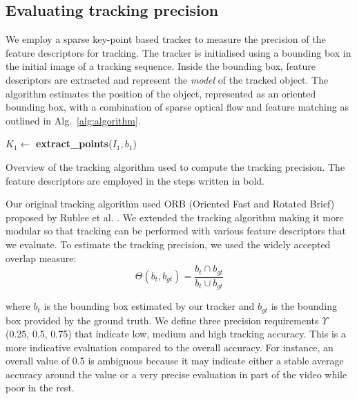 \subsection{Evaluating tracking precision}
\label{sec:accuracy}

We employ a sparse key-point based tracker to measure the precision of the feature descriptors for tracking. The tracker is initialised using a bounding box in the initial image of a tracking sequence. Inside the bounding box, feature descriptors are extracted and represent the \textit{model} of the tracked object. The algorithm estimates the position of the object, represented as an oriented bounding box, with a combination of sparse optical flow and feature matching as outlined in Alg.~\ref{alg:algorithm}. 

\begin{algorithm}[!htb]
 $K_{1} \gets$ \textbf{extract\_points}($I_{1},b_1$)\;
 \caption{\label{alg:algorithm}Overview of the tracking algorithm used to compute the tracking precision. The feature descriptors are employed in the steps written in bold. }
\end{algorithm}

Our original tracking algorithm used ORB (Oriented Fast and Rotated Brief) proposed by Rublee et al. \cite{rublee11}. 
We extended the tracking algorithm making it more modular so that tracking can be performed with 
various feature descriptors that we evaluate. To estimate the tracking precision, we used the widely accepted overlap measure:
\begin{equation}
	\Theta (b_{t}, b_{gt}) = \frac{b_{t} \cap b_{gt}}{b_{t} \cup b_{gt}}
\end{equation}

where \textit{$b_{t}$} is the bounding box estimated by our tracker and
\textit{$b_{gt}$} is the bounding box provided by the ground truth. We define 
three precision requirements $\Upsilon$ (0.25, 0.5, 0.75) that indicate low, medium and high tracking accuracy. This is a more indicative evaluation compared to the overall accuracy. For instance, an overall value of 0.5 is ambiguous because it may indicate either a stable average accuracy around the value or a very precise evaluation in part of the video while poor in the rest.

